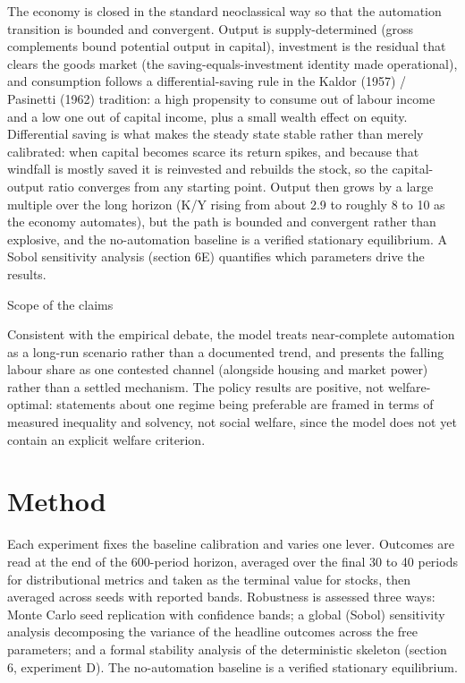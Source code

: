 \documentclass[12pt]{article}
\begin{document}
The economy is closed in the standard neoclassical way so that the
automation transition is bounded and convergent. Output is
supply-determined (gross complements bound potential output in capital),
investment is the residual that clears the goods market (the
saving-equals-investment identity made operational), and consumption
follows a differential-saving rule in the Kaldor (1957) / Pasinetti
(1962) tradition: a high propensity to consume out of labour income and
a low one out of capital income, plus a small wealth effect on equity.
Differential saving is what makes the steady state stable rather than
merely calibrated: when capital becomes scarce its return spikes, and
because that windfall is mostly saved it is reinvested and rebuilds the
stock, so the capital-output ratio converges from any starting point.
Output then grows by a large multiple over the long horizon (K/Y rising
from about 2.9 to roughly 8 to 10 as the economy automates), but the
path is bounded and convergent rather than explosive, and the
no-automation baseline is a verified stationary equilibrium. A Sobol
sensitivity analysis (section 6E) quantifies which parameters drive the
results.

Scope of the claims

Consistent with the empirical debate, the model treats near-complete
automation as a long-run scenario rather than a documented trend, and
presents the falling labour share as one contested channel (alongside
housing and market power) rather than a settled mechanism. The policy
results are positive, not welfare-optimal: statements about one regime
being preferable are framed in terms of measured inequality and
solvency, not social welfare, since the model does not yet contain an
explicit welfare criterion.

\hypertarget{method}{%
\section{Method}\label{method}}

Each experiment fixes the baseline calibration and varies one lever.
Outcomes are read at the end of the 600-period horizon, averaged over
the final 30 to 40 periods for distributional metrics and taken as the
terminal value for stocks, then averaged across seeds with reported
bands. Robustness is assessed three ways: Monte Carlo seed replication
with confidence bands; a global (Sobol) sensitivity analysis decomposing
the variance of the headline outcomes across the free parameters; and a
formal stability analysis of the deterministic skeleton (section 6,
experiment D). The no-automation baseline is a verified stationary
equilibrium.
\end{document}
